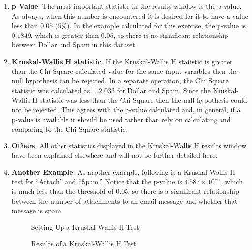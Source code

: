\begin{enumerate}
  \item \textbf{p Value}. The most important statistic in the results window is the p-value. As always, when this number is encountered it is desired for it to have a value less than $ 0.05 $ ($ 5\% $). In the example calculated for this exercise, the p-value is $ 0.1849 $, which is greater than $ 0.05 $, so there is no significant relationship between Dollar and Spam in this dataset.
  \item \textbf{Kruskal-Wallis H statistic}. If the Kruskal-Wallis H statistic is greater than the Chi Square calculated value for the same input variables then the null hypothesis can be rejected. In a separate operation, the Chi Square statistic was calculated as $ 112.033 $ for Dollar and Spam. Since the Kruskal-Wallis H statistic was less than the Chi Square then the null hypothesis could not be rejected. This agrees with the p-value calculated and, in general, if a p-value is available it should be used rather than rely on calculating and comparing to the Chi Square statistic.
  \item \textbf{Others}. All other statistics displayed in the Kruskal-Wallis H results window have been explained elsewhere and will not be further detailed here.
  \item \textbf{Another Example}. As another example, following is a Kruskal-Wallis H test for ``Attach'' and ``Spam.'' Notice that the p-value is $ 4.587 \times 10^{-5} $, which is much less than the threshold of $ 0.05 $, so there is a significant relationship between the number of attachments to an email message and whether that message is spam.
  
  \begin{figure}[H]
    \begin{center}
      \caption{Setting Up a Kruskal-Wallis H Test}
    \end{center}
  \end{figure}

  \begin{figure}[H]
    \begin{center}
      \caption{Results of a Kruskal-Wallis H Test}
    \end{center}
  \end{figure}
  
\end{enumerate}

